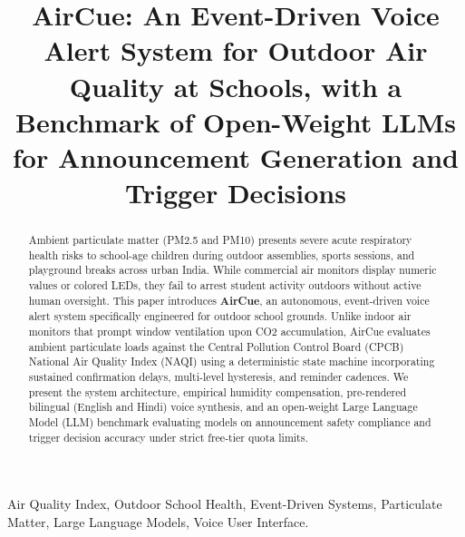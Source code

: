 \documentclass[conference]{IEEEtran}
\begin{document}
\title{AirCue: An Event-Driven Voice Alert System for Outdoor Air Quality at Schools, with a Benchmark of Open-Weight LLMs for Announcement Generation and Trigger Decisions}

\author{
\and
{}
}

\maketitle

\begin{abstract}
Ambient particulate matter (PM2.5 and PM10) presents severe acute respiratory health risks to school-age children during outdoor assemblies, sports sessions, and playground breaks across urban India. While commercial air monitors display numeric values or colored LEDs, they fail to arrest student activity outdoors without active human oversight. This paper introduces \textbf{AirCue}, an autonomous, event-driven voice alert system specifically engineered for outdoor school grounds. Unlike indoor air monitors that prompt window ventilation upon CO2 accumulation, AirCue evaluates ambient particulate loads against the Central Pollution Control Board (CPCB) National Air Quality Index (NAQI) using a deterministic state machine incorporating sustained confirmation delays, multi-level hysteresis, and reminder cadences. We present the system architecture, empirical humidity compensation, pre-rendered bilingual (English and Hindi) voice synthesis, and an open-weight Large Language Model (LLM) benchmark evaluating models on announcement safety compliance and trigger decision accuracy under strict free-tier quota limits.
\end{abstract}

\begin{IEEEkeywords}
Air Quality Index, Outdoor School Health, Event-Driven Systems, Particulate Matter, Large Language Models, Voice User Interface.
\end{IEEEkeywords}
\end{document}
